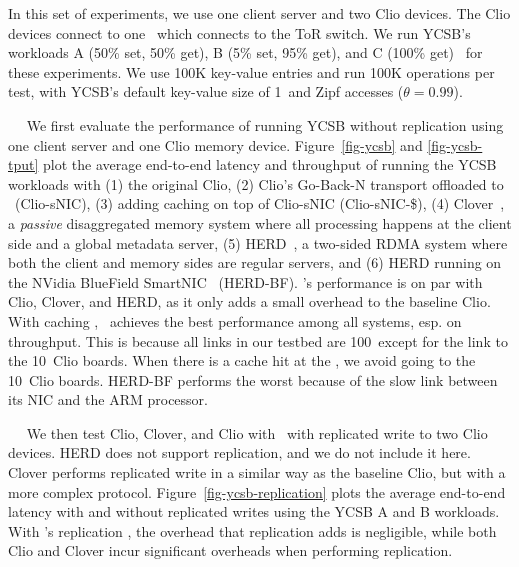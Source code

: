 In this set of experiments, we use one client server and two Clio devices. The Clio devices connect to one \snic\ which connects to the ToR switch. We run YCSB's workloads A (50\% set, 50\% get), B (5\% set, 95\% get), and C (100\% get)~\cite{ycsb-socc10} for these experiments. We use 100K key-value entries and run 100K operations per test, with YCSB's default key-value size of 1\KB\ and Zipf accesses ($\theta=0.99$). 

~~
We first evaluate the performance of running YCSB without replication using one client server and one Clio memory device.
Figure~\ref{fig-ycsb} and \ref{fig-ycsb-tput} plot the average end-to-end latency and throughput of running the YCSB workloads with (1) the original Clio, (2) Clio's Go-Back-N transport offloaded to \snic\ (Clio-sNIC), (3) adding caching on top of Clio-sNIC (Clio-sNIC-\$), (4) Clover~\cite{ATC20-pDPM}, a {\em passive} disaggregated memory system where all processing happens at the client side and a global metadata server, (5) HERD~\cite{Kalia14-RDMAKV}, a two-sided RDMA system where both the client and memory sides are regular servers, and (6) HERD running on the NVidia BlueField SmartNIC~\cite{bluefield} (HERD-BF).
\snic's performance is on par with Clio, Clover, and HERD, as it only adds a small overhead to the baseline Clio.
With caching \nt, \snic\ achieves the best performance among all systems, esp. on throughput. 
This is because all links in our testbed are 100\Gbps\ except for the link to the 10\Gbps\ Clio boards. When there is a cache hit at the \snic, we avoid going to the 10\Gbps\ Clio boards.
HERD-BF performs the worst because of the slow link between its NIC and the ARM processor.

~~
We then test Clio, Clover, and Clio with \snic\ with replicated write to two Clio devices. HERD does not support replication, and we do not include it here.
Clover performs replicated write in a similar way as the baseline Clio, but with a more complex protocol.
Figure~\ref{fig-ycsb-replication} plots the average end-to-end latency with and without replicated writes using the YCSB A and B workloads.
With \snic's replication \nt, the overhead that replication adds is negligible,
while both Clio and Clover incur significant overheads when performing replication.

